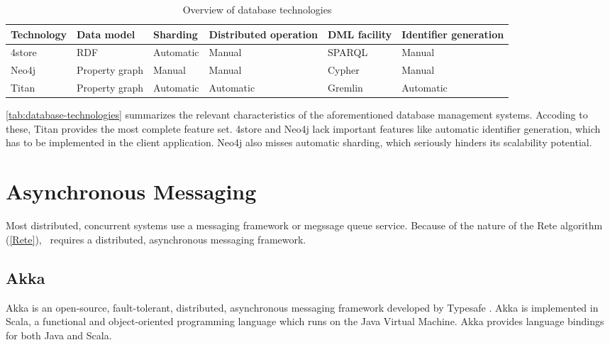 
\begin{table}[htb]

\centering
\begin{tabular}{ | l | l | l | m{2cm} | l | m{2cm} | }

\hline
\bf Technology & 
\bf Data model & 
\bf Sharding & 
\bf Distributed operation & 
\bf DML facility & 
\bf Identifier generation \tabularnewline \hline\hline
4store     & RDF            & Automatic & Manual                & SPARQL       & Manual                \\ \hline
Neo4j      & Property graph & Manual    & Manual                & Cypher       & Manual                \\ \hline
Titan      & Property graph & Automatic & Automatic             & Gremlin      & Automatic             \\ \hline

\end{tabular}
\caption{Overview of database technologies}
\label{tab:database-technologies}

\end{table}

\autoref{tab:database-technologies} summarizes the relevant characteristics of the aforementioned database management systems. Accoding to these, Titan provides the most complete feature set. 4store and Neo4j lack important features like automatic identifier generation, which has to be implemented in the client application. Neo4j also misses automatic sharding, which seriously hinders its scalability potential. 

\section{Asynchronous Messaging}

Most distributed, concurrent systems use a messaging framework or megssage queue service. Because of the nature of the Rete algorithm (\autoref{Rete}), \iqd{}\ requires a distributed, asynchronous messaging framework.

\subsection{Akka}
\label{subsec:akka}

Akka is an open-source, fault-tolerant, distributed, asynchronous messaging framework developed by Typesafe \cite{Akka}.
Akka is implemented in Scala, a functional and object-oriented programming language which runs on the Java Virtual Machine. Akka provides language bindings for both Java and Scala.

